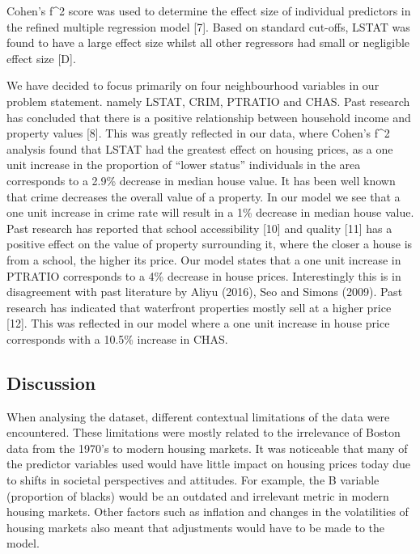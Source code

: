 \documentclass[letterpaper,10pt,twocolumn,twoside,]{pinp}
\begin{document}
Cohen's f\^{}2 score was used to determine the effect size of individual
predictors in the refined multiple regression model {[}7{]}. Based on
standard cut-offs, LSTAT was found to have a large effect size whilst
all other regressors had small or negligible effect size {[}D{]}.

We have decided to focus primarily on four neighbourhood variables in
our problem statement. namely LSTAT, CRIM, PTRATIO and CHAS. Past
research has concluded that there is a positive relationship between
household income and property values {[}8{]}. This was greatly reflected
in our data, where Cohen's f\^{}2 analysis found that LSTAT had the
greatest effect on housing prices, as a one unit increase in the
proportion of ``lower status'' individuals in the area corresponds to a
2.9\% decrease in median house value. It has been well known that crime
decreases the overall value of a property. In our model we see that a
one unit increase in crime rate will result in a 1\% decrease in median
house value. Past research has reported that school accessibility
{[}10{]} and quality {[}11{]} has a positive effect on the value of
property surrounding it, where the closer a house is from a school, the
higher its price. Our model states that a one unit increase in PTRATIO
corresponds to a 4\% decrease in house prices. Interestingly this is in
disagreement with past literature by Aliyu (2016), Seo and Simons
(2009). Past research has indicated that waterfront properties mostly
sell at a higher price {[}12{]}. This was reflected in our model where a
one unit increase in house price corresponds with a 10.5\% increase in
CHAS.

\hypertarget{discussion}{%
\subsection{Discussion}\label{discussion}}

When analysing the dataset, different contextual limitations of the data
were encountered. These limitations were mostly related to the
irrelevance of Boston data from the 1970's to modern housing markets. It
was noticeable that many of the predictor variables used would have
little impact on housing prices today due to shifts in societal
perspectives and attitudes. For example, the B variable (proportion of
blacks) would be an outdated and irrelevant metric in modern housing
markets. Other factors such as inflation and changes in the volatilities
of housing markets also meant that adjustments would have to be made to
the model.
\end{document}
